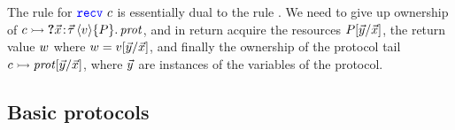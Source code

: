 The rule  for $\texttt{\color{blue} recv}\ c$ is essentially dual to the rule
.
We need to give up ownership of
$\interp{\chan}{\recvprot{\xdots}{\val}{\iprop}{\prot}}$, and
in return acquire the resources ${P}[{\vec{y}} / {\vec {x}}]$,
the return value $w$ where $w = {v}[{\vec{y}} / {\vec{x}}]$,
and finally the ownership of the protocol tail
$c \rightarrowtail {\mathit{prot}}[{\vec{y}} / {\vec {x}}]$,
where $\vec{y}$ are instances of the variables of the protocol.

\subsection{Basic protocols}
\label{sec:basics}

\newcommand{\sortfigure}{
\begin{figure}
\begin{equation*}
\begin{array}{ll}
\begin{array}[t]{@{}l@{\qquad}}
\listsortservicename\ \cmpvar\ \chan\ \eqdef\\
\quad \Let l = \recv \chan in\\
\quad \If \listlength{l} \le 1 then \send \chan \TT \Else\\
\quad \Let l' = \mathtt{split}\ l in\\
\quad \Let \chan_1 = \start{\listsortservicename\ \cmpvar} in\\
\quad \Let \chan_2 = \start{\listsortservicename\ \cmpvar} in\\
\quad \send {\chan_1} l;\ \send{\chan_2}{l'};\\
\quad \recv {\chan_1};\ \recv {\chan_2};\\
\quad \mathtt{merge}\ \mathit{\cmpvar}\ l\ l';\ \send \chan \TT
\end{array}
&
\begin{array}[t]{@{}l}
\listsortclientname\ \cmpvar\ l \eqdef \\
\quad \Let \chan = \start{\listsortservicename\ \cmpvar} in \\
\quad \send \chan l;\\
\quad \recv \chan
\end{array}
\end{array}
\end{equation*}
\caption{A distributed merge sort algorithm
(the code for $\mathtt{merge}$ and $\mathtt{split}$ is standard and thus elided).}
\label{fig:sort}
\end{figure}}

